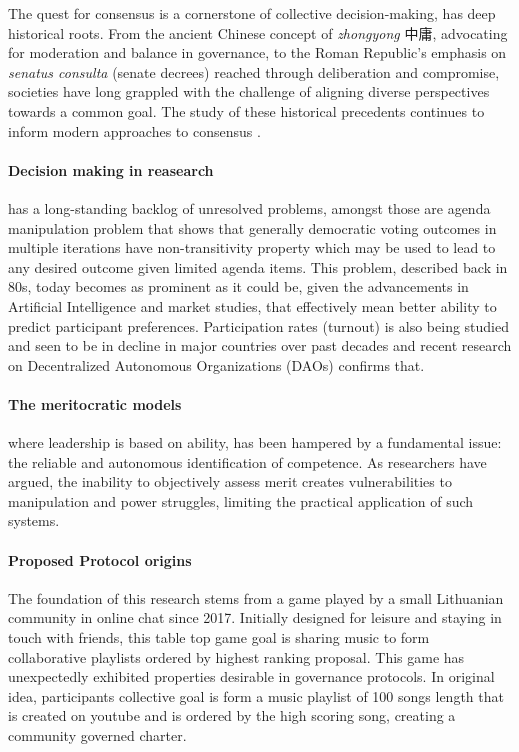 \documentclass{article}
\begin{document}
\begin{CJK}{UTF8}{gbsn}
\begin{multicols}{2}
        The quest for consensus is a cornerstone of collective decision-making, has deep historical roots. From the ancient Chinese concept of \textit{zhongyong} {中庸}, advocating for moderation and balance in governance, to the Roman Republic's emphasis on \textit{senatus consulta} (senate decrees) reached through deliberation and compromise, societies have long grappled with the challenge of aligning diverse perspectives towards a common goal. The study of these historical precedents continues to inform modern approaches to consensus \cite{Andersen2019} \cite{Frederic2014}.

        \paragraph{Decision making in reasearch} has a long-standing backlog of unresolved problems, amongst those are agenda manipulation problem that shows that generally democratic voting outcomes in multiple iterations have non-transitivity property which may be used to lead to any desired outcome given limited agenda items\cite{McKelvey1976}. This problem, described back in 80s, today becomes as prominent as it could be, given the advancements in Artificial Intelligence and market studies, that effectively mean better ability to predict participant preferences. Participation rates (turnout) is also being studied and seen to be in decline in major countries over past decades \cite{Lawrence23}\cite{Filip24} and recent research on Decentralized Autonomous Organizations (DAOs) confirms that\cite{Rainer2023}\cite{Marcella2016}\cite{Xuan2024}.
        \paragraph{The meritocratic models} where leadership is based on ability, has been hampered by a fundamental issue: the reliable and autonomous identification of competence. As researchers have argued\cite{Arrow2000}, the inability to objectively assess merit creates vulnerabilities to manipulation and power struggles, limiting the practical application of such systems.


        \paragraph{Proposed Protocol origins}\label{sec:protocol_origins}
        The foundation of this research stems from a game played by a small Lithuanian community in online chat since 2017. Initially designed for leisure and staying in touch with friends, this table top game goal is sharing music to form collaborative playlists ordered by highest ranking proposal. This game has unexpectedly exhibited properties desirable in governance protocols.
        In original idea, participants collective goal is form a music playlist of 100 songs length that is created on youtube and is ordered by the high scoring song, creating a community governed charter\cite{DariusYoutube}.


\end{multicols}
\end{CJK}
\end{document}
